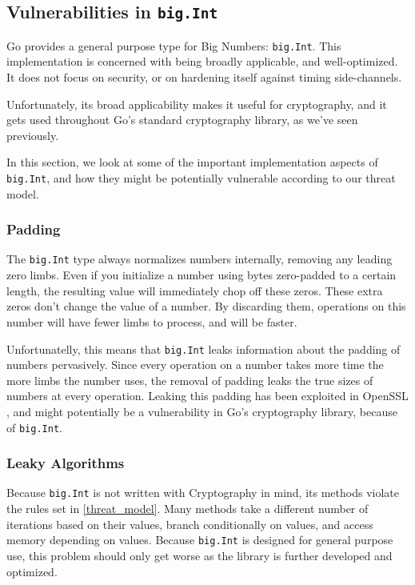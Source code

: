 \documentclass[11pt, a4paper]{article} %
\begin{document}
{\subsection{Vulnerabilities in \texttt{big.Int}}

Go provides a general purpose type for Big Numbers: \texttt{big.Int}.
This implementation is concerned with being broadly applicable,
and well-optimized. It does not focus on security, or on hardening
itself against timing side-channels.

Unfortunately, its broad applicability makes it useful for cryptography,
and it gets used throughout Go's standard cryptography library,
as we've seen previously.

In this section, we look at some of the important implementation aspects
of \texttt{big.Int}, and how they might be potentially vulnerable
according to our threat model.

\subsubsection{Padding}

The \texttt{big.Int} type always normalizes numbers internally,
removing any leading zero limbs. Even if you initialize a number
using bytes zero-padded to a certain length, the resulting value
will immediately chop off these zeros. These extra zeros don't
change the value of a number. By discarding them, operations on
this number will have fewer limbs to process, and will be faster.

Unfortunatelly, this means that \texttt{big.Int} leaks information
about the padding of numbers pervasively. Since every operation on
a number takes more time the more limbs the number uses,
the removal of padding leaks the true sizes of numbers
at every operation.
Leaking this padding has been exploited
in OpenSSL \cite{merget_raccoon_2019}, and might potentially
be a vulnerability in Go's cryptography library, because of \texttt{big.Int}.

\subsubsection{Leaky Algorithms}

Because \texttt{big.Int} is not written with Cryptography in mind,
its methods violate the rules set in
\ref{threat_model}. Many methods take a different number of iterations
based on their values, branch conditionally on values, and
access memory depending on values. Because \texttt{big.Int}
is designed for general purpose use, this problem should only get worse
as the library is further developed and optimized.

}
\end{document}
